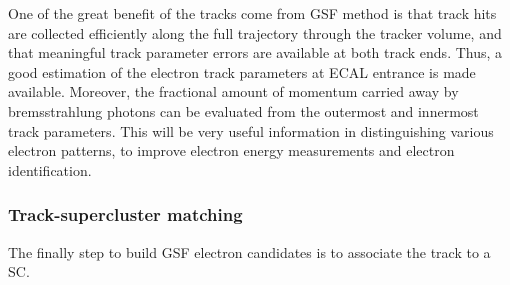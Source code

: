 
One of the great benefit of the tracks come from GSF method is that track hits are collected efficiently along the full trajectory through the tracker volume, and that meaningful track parameter errors are available at both track ends. Thus, a good estimation of the electron track parameters at ECAL entrance is made available.
Moreover, the fractional amount of momentum carried away by bremsstrahlung photons can be evaluated from the outermost and innermost track parameters. This will be very useful information in distinguishing various electron patterns, to improve electron energy measurements and electron identification.


\subsubsection*{Track-supercluster matching}\label{subsec:track_sc_matching}

The finally step to build GSF electron candidates is to associate the track to a SC.

